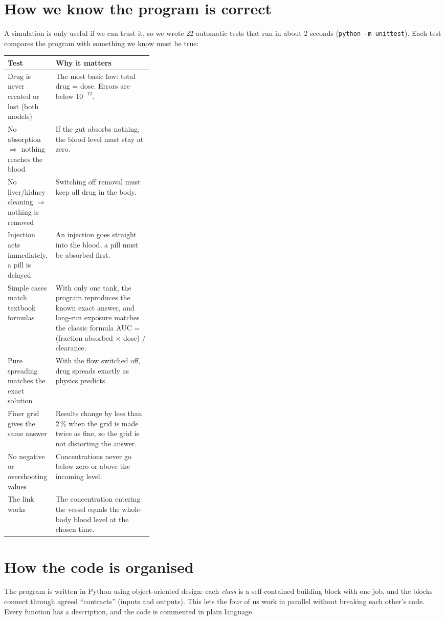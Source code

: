 \documentclass[10.5pt]{article}
\begin{document}
\section{How we know the program is correct}
A simulation is only useful if we can trust it, so we wrote 22 automatic tests that run in about 2 seconds
(\texttt{python -m unittest}). Each test compares the program with something we know must be true:

\begin{center}\small
\begin{tabularx}{\linewidth}{@{}>{\raggedright}p{0.33\linewidth} X@{}}
\toprule
\textbf{Test} & \textbf{Why it matters}\\\midrule
Drug is never created or lost (both models) & The most basic law: total drug = dose. Errors are below $10^{-12}$.\\
No absorption $\Rightarrow$ nothing reaches the blood & If the gut absorbs nothing, the blood level must stay at zero.\\
No liver/kidney cleaning $\Rightarrow$ nothing is removed & Switching off removal must keep all drug in the body.\\
Injection acts immediately, a pill is delayed & An injection goes straight into the blood, a pill must be absorbed first.\\
Simple cases match textbook formulas & With only one tank, the program reproduces the known exact answer, and long-run
exposure matches the classic formula AUC = (fraction absorbed $\times$ dose) / clearance.\\
Pure spreading matches the exact solution & With the flow switched off, drug spreads exactly as physics predicts.\\
Finer grid gives the same answer & Results change by less than 2\,\% when the grid is made twice as fine, so the grid
is not distorting the answer.\\
No negative or overshooting values & Concentrations never go below zero or above the incoming level.\\
The link works & The concentration entering the vessel equals the whole-body blood level at the chosen time.\\
\bottomrule
\end{tabularx}
\end{center}

\section{How the code is organised}
The program is written in Python using object-oriented design: each \emph{class} is a self-contained building
block with one job, and the blocks connect through agreed ``contracts'' (inputs and outputs). This lets the four of
us work in parallel without breaking each other's code. Every function has a description, and the code is commented
in plain language.
\end{document}
